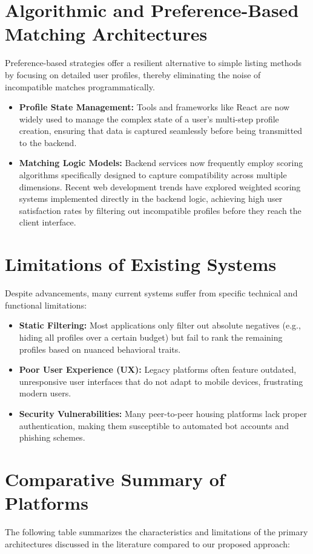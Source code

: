 \documentclass[12pt,a4paper]{report}
\begin{document}
\section{Algorithmic and Preference-Based Matching Architectures}
Preference-based strategies offer a resilient alternative to simple listing methods by focusing on detailed user profiles, thereby eliminating the noise of incompatible matches programmatically.
\begin{itemize}
    \item \textbf{Profile State Management:} Tools and frameworks like React are now widely used to manage the complex state of a user's multi-step profile creation, ensuring that data is captured seamlessly before being transmitted to the backend.
    \item \textbf{Matching Logic Models:} Backend services now frequently employ scoring algorithms specifically designed to capture compatibility across multiple dimensions. Recent web development trends have explored weighted scoring systems implemented directly in the backend logic, achieving high user satisfaction rates by filtering out incompatible profiles before they reach the client interface.
\end{itemize}

\section{Limitations of Existing Systems}
Despite advancements, many current systems suffer from specific technical and functional limitations:
\begin{itemize}
    \item \textbf{Static Filtering:} Most applications only filter out absolute negatives (e.g., hiding all profiles over a certain budget) but fail to rank the remaining profiles based on nuanced behavioral traits.
    \item \textbf{Poor User Experience (UX):} Legacy platforms often feature outdated, unresponsive user interfaces that do not adapt to mobile devices, frustrating modern users.
    \item \textbf{Security Vulnerabilities:} Many peer-to-peer housing platforms lack proper authentication, making them susceptible to automated bot accounts and phishing schemes.
\end{itemize}

\section{Comparative Summary of Platforms}
The following table summarizes the characteristics and limitations of the primary architectures discussed in the literature compared to our proposed approach:
\end{document}
